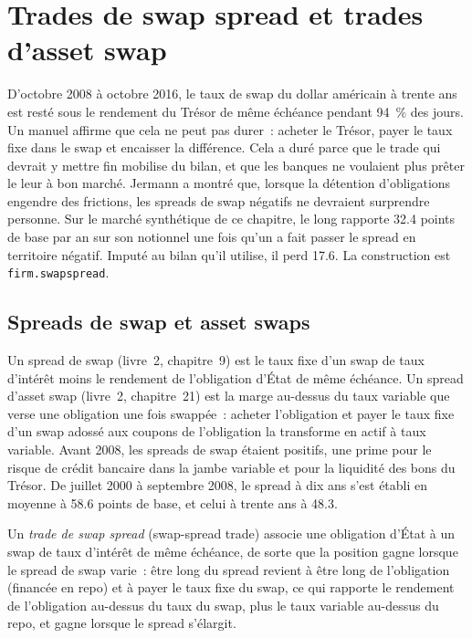 \chapter{Trades de swap spread et trades d'asset swap}\label{ch:s2:swap-spread-and-asset-swap-trades}

D'octobre 2008 à octobre 2016, le taux de swap du dollar américain à trente ans est resté sous le rendement du Trésor de même échéance pendant 94~\% des jours. Un manuel
affirme que cela ne peut pas durer~: acheter le Trésor, payer le taux fixe dans le swap et encaisser la différence. Cela a duré parce que le trade qui devrait y mettre fin mobilise
du bilan, et que les banques ne voulaient plus prêter le leur à bon marché. Jermann a montré que, lorsque la détention d'obligations engendre des frictions, les spreads de swap
négatifs ne devraient surprendre personne. Sur le marché synthétique de ce chapitre, le  long rapporte 32.4 points de base par an sur son notionnel une fois
qu'un  a fait passer le spread en territoire négatif. Imputé au bilan qu'il utilise, il perd 17.6. La construction est \texttt{firm.swapspread}.

\section{Spreads de swap et asset swaps}

Un spread de swap (livre~2, chapitre~9) est le taux fixe d'un swap de taux d'intérêt moins le rendement de l'obligation d'État de même échéance. Un spread d'asset
swap (livre~2, chapitre~21) est la marge au-dessus du taux variable que verse une obligation une fois swappée~: acheter l'obligation et payer le taux fixe d'un swap adossé aux
coupons de l'obligation la transforme en actif à taux variable. Avant 2008, les spreads de swap étaient positifs, une prime pour le risque de crédit bancaire dans la jambe variable et pour
la liquidité des bons du Trésor. De juillet 2000 à septembre 2008, le spread à dix ans s'est établi en moyenne à 58.6 points de base, et celui à trente ans à 48.3.

\begin{definition}\label{def:s2:swap-spread-and-asset-swap-trades:trade}
Un \emph{trade de swap spread} (swap-spread trade) associe une obligation d'État à un swap de taux d'intérêt de même échéance, de sorte que la position
gagne lorsque le spread de swap varie~: être long du spread revient à être long de l'obligation (financée en repo) et à payer le taux fixe du swap, ce qui rapporte le rendement de l'obligation au-dessus du
taux du swap, plus le taux variable au-dessus du repo, et gagne lorsque le spread s'élargit.
\end{definition}


